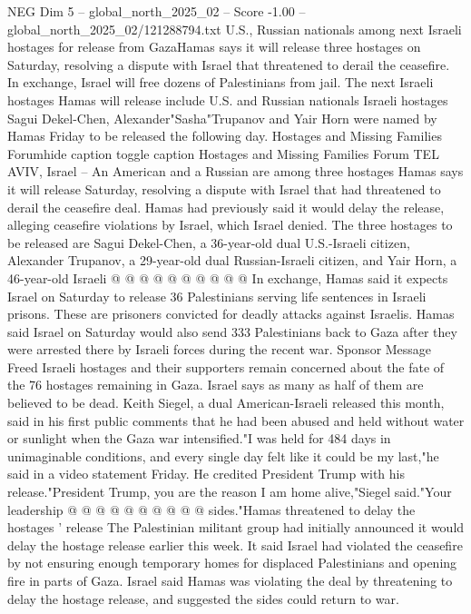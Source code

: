 \begin{textsample}{NEG Dim 5 – global\_north\_2025\_02 – Score -1.00 – global\_north\_2025\_02/121288794.txt}  \label{ex:f5_neg_243}
U.S., Russian nationals among next Israeli hostages for release from GazaHamas says it will release three hostages on Saturday, resolving a dispute with Israel that threatened to derail the ceasefire.
In exchange, Israel will free dozens of Palestinians from jail.
The next Israeli hostages Hamas will release include U.S. and Russian nationals Israeli hostages Sagui Dekel-Chen, Alexander"Sasha"Trupanov and Yair Horn were named by Hamas Friday to be released the following day.
Hostages and Missing Families Forumhide caption toggle caption Hostages and Missing Families Forum TEL AVIV, Israel -- An American and a Russian are among three hostages Hamas says it will release Saturday, resolving a dispute with Israel that had threatened to derail the ceasefire deal.
Hamas had previously said it would delay the release, alleging ceasefire violations by Israel, which Israel denied.
The three hostages to be released are Sagui Dekel-Chen, a 36-year-old dual U.S.-Israeli citizen, Alexander Trupanov, a 29-year-old dual Russian-Israeli citizen, and Yair Horn, a 46-year-old Israeli @ @ @ @ @ @ @ @ @ @ In exchange, Hamas said it expects Israel on Saturday to release 36 Palestinians serving life sentences in Israeli prisons.
These are prisoners convicted for deadly attacks against Israelis.
Hamas said Israel on Saturday would also send 333 Palestinians back to Gaza after they were arrested there by Israeli forces during the recent war.
Sponsor Message Freed Israeli hostages and their supporters remain concerned about the fate of the 76 hostages remaining in Gaza.
Israel says as many as half of them are believed to be dead.
Keith Siegel, a dual American-Israeli released this month, said in his first public comments that he had been abused and held without water or sunlight when the Gaza war intensified."I was held for 484 days in unimaginable conditions, and every single day felt like it could be my last,"he said in a video statement Friday.
He credited President Trump with his release."President Trump, you are the reason I am home alive,"Siegel said."Your leadership @ @ @ @ @ @ @ @ @ @ sides."Hamas threatened to delay the hostages ' release The Palestinian militant group had initially announced it would delay the hostage release earlier this week.
It said Israel had violated the ceasefire by not ensuring enough temporary homes for displaced Palestinians and opening fire in parts of Gaza.
Israel said Hamas was violating the deal by threatening to delay the hostage release, and suggested the sides could return to war.

\end{textsample}
